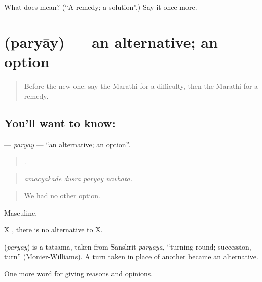 \begin{tcolorbox}[breakable,colback=teal!4,colframe=teal!35!black,title={Before you move on}]
What does  mean? (\textquotedblleft{}A remedy; a solution\textquotedblright{}.) Say it once more.
\end{tcolorbox}
\section[\texorpdfstring{\mr{पर्याय} (paryāy)}{पर्याय (paryāy)}]{ (paryāy) — an alternative; an option}

\label{lesson:MR-C349-paryay}



\begin{quote}
Before the new one: say the Marathi for a difficulty, then the Marathi for a remedy.
\end{quote}

\subsection*{You'll want to know: }
\textbf{} — \emph{paryāy} — \textquotedblleft{}an alternative; an option\textquotedblright{}.

\begin{quote}
   .
\end{quote}

\begin{quote}
\emph{āmacyākaḍe dusrā paryāy navhatā.}
\end{quote}

\begin{quote}
We had no other option.
\end{quote}

Masculine.

X   , there is no alternative to X.

\begin{cousinweb}
\textbf{} (\emph{paryāy}) is a tatsama, taken from Sanskrit \emph{paryāya}, \textquotedblleft{}turning round; succession, turn\textquotedblright{} (Monier-Williams). A turn taken in place of another became an alternative.
\end{cousinweb}

\begin{grammarlens}[title={What you've built}]
One more word for giving reasons and opinions.
\end{grammarlens}


